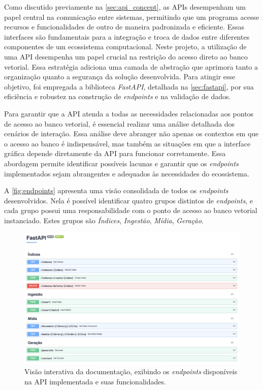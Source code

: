 \documentclass[a4paper, 12pt]{article}
\begin{document}
    Como discutido previamente na \autoref{sec:api_concept}, as APIs desempenham um papel central na comunicação entre sistemas, permitindo que um programa acesse recursos e funcionalidades de outro de maneira padronizada e eficiente. Essas interfaces são fundamentais para a integração e troca de dados entre diferentes componentes de um ecossistema computacional. Neste projeto, a utilização de uma API desempenha um papel crucial na restrição do acesso direto ao banco vetorial. Essa estratégia adiciona uma camada de abstração que aprimora tanto a organização quanto a segurança da solução desenvolvida. Para atingir esse objetivo, foi empregada a biblioteca \textit{FastAPI}, detalhada na \autoref{sec:fastapi}, por sua eficiência e robustez na construção de \textit{endpoints} e na validação de dados.
    
    Para garantir que a API atenda a todas as necessidades relacionadas aos pontos de acesso ao banco vetorial, é essencial realizar uma análise detalhada dos cenários de interação. Essa análise deve abranger não apenas os contextos em que o acesso ao banco é indispensável, mas também as situações em que a interface gráfica depende diretamente da API para funcionar corretamente. Essa abordagem permite identificar possíveis lacunas e garantir que os \textit{endpoints} implementados sejam abrangentes e adequados às necessidades do ecossistema. 
    
    A \autoref{fig:endpoints} apresenta uma visão consolidada de todos os \textit{endpoints} desenvolvidos. Nela é possível identificar quatro grupos distintos de \textit{endpoints}, e cada grupo possui uma responsabilidade com o ponto de acesso ao banco vetorial instanciado. Estes grupos são \textit{Índices}, \textit{Ingestão}, \textit{Mídia}, \textit{Geração}.
    
    \clearpage

    \begin{figure}[ht]
        \includegraphics[width=\textwidth,height=0.9\textheight,keepaspectratio]{endpoints.png}
        \centering
        \caption{Visão interativa da documentação, exibindo os \textit{endpoints} disponíveis na API implementada e suas funcionalidades.}
        \centering
        \label{fig:endpoints}
    \end{figure}
\end{document}
